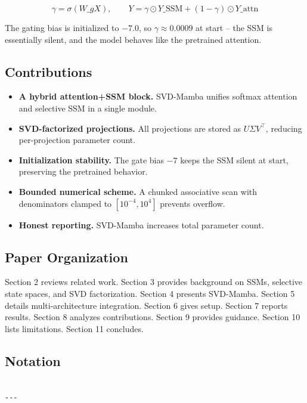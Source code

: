 \[
\gamma = \sigma(W\_g X), \qquad
Y = \gamma \odot Y\_\text{SSM} + (1 - \gamma) \odot Y\_\text{attn}
\tag{1.3}
\]

The gating bias is initialized to $-7.0$, so $\gamma \approx 0.0009$ at 
start -- the SSM is essentially silent, and the model behaves like the 
pretrained attention.

\subsection{Contributions}

\begin{itemize}
\item \textbf{A hybrid attention+SSM block.} SVD-Mamba unifies softmax attention
  and selective SSM in a single module.
\item \textbf{SVD-factorized projections.} All projections are stored as
  $U \Sigma V^\top$, reducing per-projection parameter count.
\item \textbf{Initialization stability.} The gate bias $-7$ keeps the SSM silent
  at start, preserving the pretrained behavior.
\item \textbf{Bounded numerical scheme.} A chunked associative scan with
  denominators clamped to $[10^{-4}, 10^{4}]$ prevents overflow.
\item \textbf{Honest reporting.} SVD-Mamba increases total parameter count.

\end{itemize}
\subsection{Paper Organization}

Section 2 reviews related work. Section 3 provides background on SSMs, 
selective state spaces, and SVD factorization. Section 4 presents SVD-Mamba. 
Section 5 details multi-architecture integration. Section 6 gives setup. 
Section 7 reports results. Section 8 analyzes contributions. Section 9 
provides guidance. Section 10 lists limitations. Section 11 concludes.



\subsection{Notation}

\begin{lstlisting}

---
\end{lstlisting}